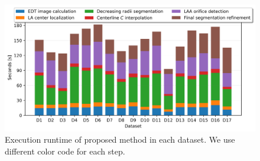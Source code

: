 \documentclass[review]{elsarticle}
\begin{document}
\begin{figure}[t]
  \centering
  \includegraphics[width=\linewidth]{fig13.png}
  \caption{Execution runtime of proposed method in each dataset. We use different color code for each step.
  }
  \label{fig:runtime_plot}       %
\end{figure}


\end{document}
